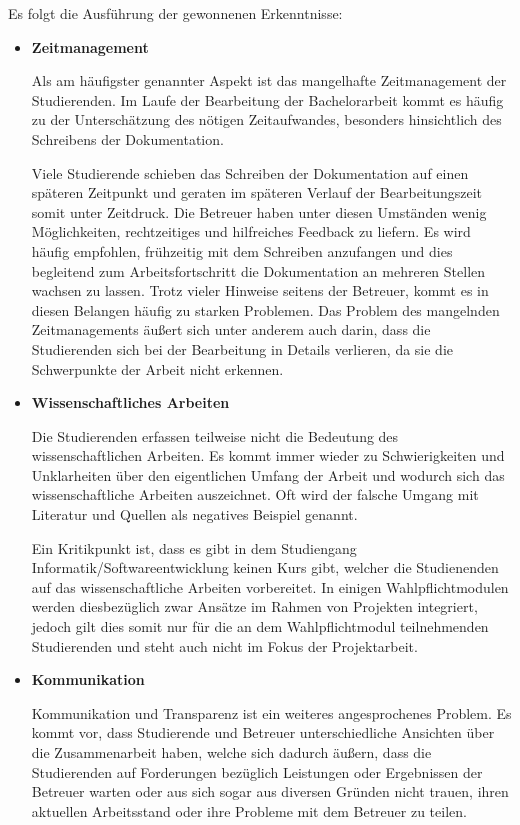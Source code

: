 \documentclass{scrreprt}
\begin{document}
\par\medskip Es folgt die Ausführung der gewonnenen Erkenntnisse:
\begin{itemize}
\item \textbf{Zeitmanagement}
\par Als am häufigster genannter Aspekt ist das mangelhafte Zeitmanagement der Studierenden. Im Laufe der Bearbeitung der Bachelorarbeit kommt es häufig zu der Unterschätzung des nötigen  Zeitaufwandes, besonders hinsichtlich des Schreibens der Dokumentation. 
\par Viele Studierende schieben das Schreiben der Dokumentation auf einen späteren Zeitpunkt und geraten im späteren Verlauf der Bearbeitungszeit somit unter Zeitdruck. Die Betreuer haben unter diesen Umständen wenig Möglichkeiten, rechtzeitiges und hilfreiches Feedback zu liefern. Es wird häufig empfohlen, frühzeitig mit dem Schreiben anzufangen und dies begleitend zum Arbeitsfortschritt die Dokumentation an mehreren Stellen wachsen zu lassen. Trotz vieler Hinweise seitens der Betreuer, kommt es in diesen Belangen häufig zu starken Problemen.
Das Problem des mangelnden Zeitmanagements äußert sich unter anderem auch darin, dass die Studierenden sich bei der Bearbeitung in Details verlieren, da sie die Schwerpunkte der Arbeit nicht erkennen.
\item \textbf{Wissenschaftliches Arbeiten}
\par Die Studierenden erfassen teilweise nicht die Bedeutung des wissenschaftlichen Arbeiten. Es kommt immer wieder zu Schwierigkeiten und Unklarheiten über den eigentlichen Umfang der Arbeit und wodurch sich das wissenschaftliche Arbeiten auszeichnet. Oft wird der falsche Umgang mit Literatur und Quellen als negatives Beispiel genannt.
\par Ein Kritikpunkt ist, dass es gibt in dem Studiengang Informatik/Softwareentwicklung keinen Kurs gibt, welcher die Studienenden auf das wissenschaftliche Arbeiten vorbereitet. In einigen Wahlpflichtmodulen werden diesbezüglich zwar Ansätze im Rahmen von Projekten integriert, jedoch gilt dies somit nur für die an dem Wahlpflichtmodul teilnehmenden Studierenden und steht auch nicht im Fokus der Projektarbeit.
\item \textbf{Kommunikation}
\par Kommunikation und Transparenz ist ein weiteres angesprochenes Problem. Es kommt vor, dass Studierende und Betreuer unterschiedliche Ansichten über die Zusammenarbeit haben, welche sich dadurch äußern, dass die Studierenden auf Forderungen bezüglich Leistungen oder Ergebnissen der Betreuer warten oder aus sich sogar aus diversen Gründen nicht trauen, ihren aktuellen Arbeitsstand oder ihre Probleme mit dem Betreuer zu teilen. 

\end{itemize}
\end{document}

